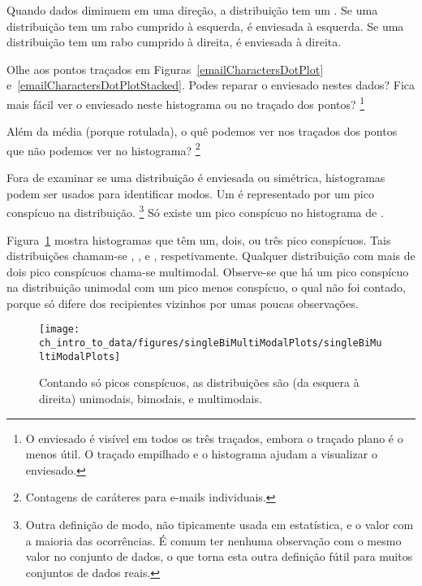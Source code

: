 \begin{termBox}{%
 Quando dados diminuem em uma direção, a distribuição tem um .
  Se uma distribuição tem um rabo cumprido à esquerda, é enviesada à esquerda.
  Se uma distribuição tem um rabo cumprido à direita, é enviesada à direita.}
\end{termBox}

\begin{exercise}
 Olhe aos pontos traçados em Figuras~\ref{emailCharactersDotPlot} e~\ref{emailCharactersDotPlotStacked}.
 Podes reparar o enviesado nestes dados?
 Fica mais fácil ver o enviesado neste histograma ou no traçado dos pontos?
 \footnote{O enviesado é visível em todos os três traçados, embora o traçado plano é o menos útil.
 O traçado empilhado e o histograma ajudam a visualizar o enviesado.}
\end{exercise}

\begin{exercise}
 Além da média (porque rotulada), o quê podemos ver nos traçados dos pontos que não podemos ver no histograma?
 \footnote{Contagens de caráteres para e-mails individuais.}
\end{exercise}

Fora de examinar se uma distribuição é enviesada ou simétrica, histogramas podem ser usados para identificar modos.
Um  é representado por um pico conspícuo na distribuição.
\footnote{Outra definição de modo, não tipicamente usada em estatística, e o valor com a maioria das ocorrências.
É comum ter nenhuma observação com o mesmo valor no conjunto de dados, o que torna esta outra definição fútil para muitos conjuntos de dados reais.}
Só existe um pico conspícuo no histograma de .

Figura~\ref{singleBiMultiModalPlots} mostra histogramas que têm um, dois, ou três pico conspícuos.
Tais distribuições chamam-se , , e , respetivamente.
Qualquer distribuição com mais de dois pico conspícuos chama-se multimodal.
Observe-se que há um pico conspícuo na distribuição unimodal com um pico menos conspícuo, o qual não foi contado, porque só difere dos recipientes vizinhos por umas poucas observações.

\begin{figure}[h]
   \centering
   \texttt{[image: ch\_intro\_to\_data/figures/singleBiMultiModalPlots/singleBiMultiModalPlots]}
   \caption{Contando só picos conspícuos, as distribuições são (da esquera à direita) unimodais, bimodais, e multimodais.}
   \label{singleBiMultiModalPlots}
\end{figure}

